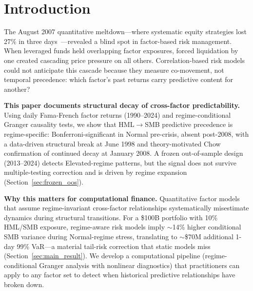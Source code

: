 \documentclass[sigconf,anonymous]{acmart}
\begin{document}


\maketitle

\section{Introduction}

The August 2007 quantitative meltdown---where systematic equity strategies
lost 27\% in three days~\cite{khandani2011quants}---revealed a blind spot
in factor-based risk management. When leveraged funds held overlapping factor
exposures, forced liquidation by one created cascading price pressure on all
others. Correlation-based risk models could not anticipate this cascade because
they measure co-movement, not temporal precedence: which factor's past
returns carry predictive content for another?

\textbf{This paper documents structural decay of cross-factor predictability.}
Using daily Fama-French factor returns (1990--2024) and regime-conditional
Granger causality tests, we show that HML$\to$SMB predictive precedence
is regime-specific: Bonferroni-significant in Normal pre-crisis, absent
post-2008, with a data-driven structural break at June 1998 and
theory-motivated Chow confirmation of continued decay at January 2008.
A frozen out-of-sample design (2013--2024) detects Elevated-regime
patterns, but the signal does not survive multiple-testing correction
and is driven by regime expansion (Section~\ref{sec:frozen_oos}).

\textbf{Why this matters for computational finance.}
Quantitative factor models that assume regime-invariant cross-factor
relationships systematically misestimate dynamics during structural transitions.
For a \$100B portfolio with 10\% HML/SMB exposure, regime-aware risk models
imply $\sim$14\% higher conditional SMB variance during Normal-regime stress,
translating to $\sim$\$70M additional 1-day 99\% VaR---a material tail-risk
correction that static models miss (Section~\ref{sec:main_result}).
We develop a computational pipeline (regime-conditional Granger analysis
with nonlinear diagnostics) that practitioners can apply to any factor set
to detect when historical predictive relationships have broken down.
\end{document}
